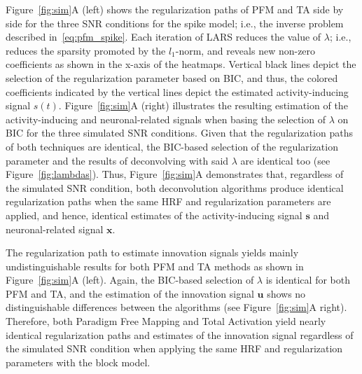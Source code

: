 Figure~\ref{fig:sim}A (left) shows the regularization paths of PFM and TA side by side for the three SNR conditions for the spike model; i.e., the inverse problem described in~\eqref{eq:pfm_spike}. Each iteration of LARS reduces the value of \(\lambda\); i.e., reduces the sparsity promoted by the \(l_1\)-norm, and reveals new non-zero coefficients as shown in the x-axis of the heatmaps. Vertical black lines depict the selection of the regularization parameter based on BIC, and thus, the colored coefficients indicated by the vertical lines depict the estimated activity-inducing signal \(s(t)\). Figure~\ref{fig:sim}A (right) illustrates the resulting estimation of the activity-inducing and neuronal-related signals when basing the selection of \(\lambda\) on BIC for the three simulated SNR conditions. Given that the regularization paths of both techniques are identical, the BIC-based selection of the regularization parameter and the results of deconvolving with said \(\lambda\) are identical too (see Figure~\ref{fig:lambdas}). Thus, Figure~\ref{fig:sim}A demonstrates that, regardless of the simulated SNR condition, both deconvolution algorithms produce identical regularization paths when the same HRF and regularization parameters are applied, and hence, identical estimates of the activity-inducing signal \(\mathbf{s}\) and neuronal-related signal \(\mathbf{x}\).

The regularization path to estimate innovation signals yields mainly undistinguishable results for both PFM and TA methods as shown in Figure~\ref{fig:sim}A (left). Again, the BIC-based selection of \(\lambda\) is identical for both PFM and TA, and the estimation of the innovation signal \(\mathbf{u}\) shows no distinguishable differences between the algorithms (see Figure~\ref{fig:sim}A right). Therefore, both Paradigm Free Mapping and Total Activation yield nearly identical regularization paths and estimates of the innovation signal regardless of the simulated SNR condition when applying the same HRF and regularization parameters with the block model.


